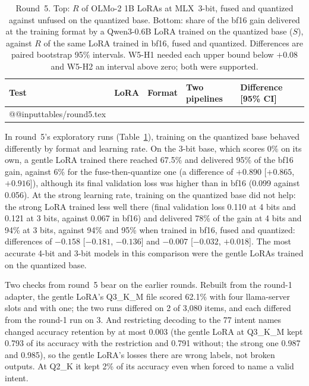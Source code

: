 \documentclass[10pt]{article}
\makeatletter
\newcommand*{\tablerows}[1]{\csname @@input\endcsname #1 }
\makeatother
\begin{document}
\begin{table}[htbp]
\centering\footnotesize
\caption{Round~5. Top: $R$ of OLMo-2 1B LoRAs at MLX~3-bit, fused and quantized against unfused on the quantized base. Bottom: share of the bf16 gain delivered at the training format by a Qwen3-0.6B LoRA trained on the quantized base ($S$), against $R$ of the same LoRA trained in bf16, fused and quantized. Differences are paired bootstrap 95\% intervals. W5-H1 needed each upper bound below $+0.08$ and W5-H2 an interval above zero; both were supported.}
\label{tab:round5}
\begin{tabular}{lllll}
\toprule
Test & LoRA & Format & Two pipelines & Difference [95\% CI] \\
\midrule
\tablerows{tables/round5.tex}
\bottomrule
\end{tabular}
\end{table}


In round~5's exploratory runs (Table~\ref{tab:round5}), training on the quantized base behaved differently by format and learning rate. On the 3-bit base, which scores 0\% on its own, a gentle LoRA trained there reached 67.5\% and delivered 95\% of the bf16 gain, against 6\% for the fuse-then-quantize one (a difference of $+0.890$ [$+0.865$, $+0.916$]), although its final validation loss was higher than in bf16 (0.099 against 0.056). At the strong learning rate, training on the quantized base did not help: the strong LoRA trained less well there (final validation loss 0.110 at 4 bits and 0.121 at 3 bits, against 0.067 in bf16) and delivered 78\% of the gain at 4 bits and 94\% at 3 bits, against 94\% and 95\% when trained in bf16, fused and quantized: differences of $-0.158$ [$-0.181$, $-0.136$] and $-0.007$ [$-0.032$, $+0.018$]. The most accurate 4-bit and 3-bit models in this comparison were the gentle LoRAs trained on the quantized base.

Two checks from round~5 bear on the earlier rounds. Rebuilt from the round-1 adapter, the gentle LoRA's Q3\_K\_M file scored 62.1\% with four llama-server slots and with one; the two runs differed on 2 of 3,080 items, and each differed from the round-1 run on 3. And restricting decoding to the 77 intent names changed accuracy retention by at most 0.003 (the gentle LoRA at Q3\_K\_M kept 0.793 of its accuracy with the restriction and 0.791 without; the strong one 0.987 and 0.985), so the gentle LoRA's losses there are wrong labels, not broken outputs. At Q2\_K it kept 2\% of its accuracy even when forced to name a valid intent.
\end{document}
